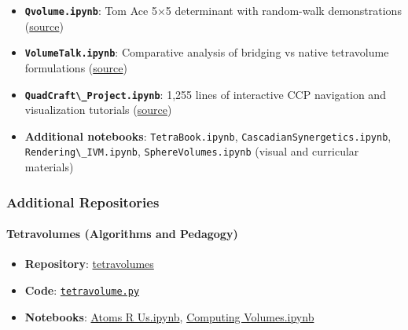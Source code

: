 \documentclass[
  10pt,
]{article}
\newcommand{\passthrough}[1]{#1}
\providecommand{\tightlist}{%
  \setlength{\itemsep}{0pt}\setlength{\parskip}{0pt}}
\begin{document}
\begin{itemize}
\tightlist
\item
  \textbf{\passthrough{\lstinline!Qvolume.ipynb!}}: Tom Ace 5×5
  determinant with random-walk demonstrations
  (\href{https://github.com/4dsolutions/School_of_Tomorrow/blob/master/Qvolume.ipynb}{source})
\item
  \textbf{\passthrough{\lstinline!VolumeTalk.ipynb!}}: Comparative
  analysis of bridging vs native tetravolume formulations
  (\href{https://github.com/4dsolutions/School_of_Tomorrow/blob/master/VolumeTalk.ipynb}{source})
\item
  \textbf{\passthrough{\lstinline!QuadCraft\_Project.ipynb!}}: 1,255
  lines of interactive CCP navigation and visualization tutorials
  (\href{https://github.com/4dsolutions/School_of_Tomorrow/blob/master/QuadCraft_Project.ipynb}{source})
\item
  \textbf{Additional notebooks}:
  \passthrough{\lstinline!TetraBook.ipynb!},
  \passthrough{\lstinline!CascadianSynergetics.ipynb!},
  \passthrough{\lstinline!Rendering\_IVM.ipynb!},
  \passthrough{\lstinline!SphereVolumes.ipynb!} (visual and curricular
  materials)
\end{itemize}

\subsubsection{Additional Repositories}\label{additional-repositories}

\paragraph{Tetravolumes (Algorithms and
Pedagogy)}\label{tetravolumes-algorithms-and-pedagogy}

\begin{itemize}
\tightlist
\item
  \textbf{Repository}:
  \href{https://github.com/4dsolutions/tetravolumes}{tetravolumes}
\item
  \textbf{Code}:
  \href{https://github.com/4dsolutions/tetravolumes/blob/master/tetravolume.py}{\passthrough{\lstinline!tetravolume.py!}}
\item
  \textbf{Notebooks}:
  \href{https://raw.githubusercontent.com/4dsolutions/tetravolumes/refs/heads/master/Atoms\%20R\%20Us.ipynb}{Atoms
  R Us.ipynb},
  \href{https://raw.githubusercontent.com/4dsolutions/tetravolumes/refs/heads/master/Computing\%20Volumes.ipynb}{Computing
  Volumes.ipynb}
\end{itemize}
\end{document}
